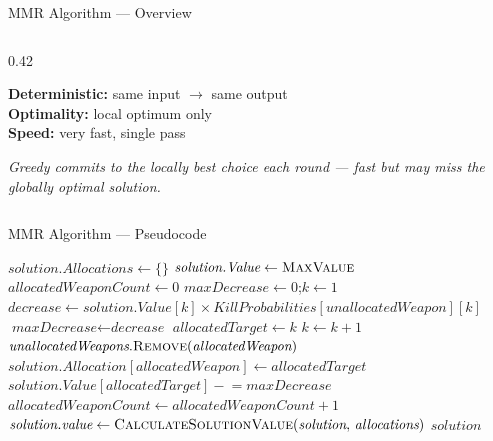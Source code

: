 \documentclass[aspectratio=169,10pt]{beamer}
\begin{document}
\begin{frame}{MMR Algorithm --- Overview}
\begin{columns}[T]
\begin{column}{0.42\textwidth}
{\begin{minipage}{\linewidth}
        {\small\color{navydark}\bfseries Deterministic:\;}
          {\small same input $\to$ same output}\\[5pt]
        {\small\color{navydark}\bfseries Optimality:\;}
          {\small local optimum only}\\[5pt]
        {\small\color{navydark}\bfseries Speed:\;}
          {\small very fast, single pass}
        \vspace{6pt}
      \end{minipage}}
      \vspace{16pt}
      \colorbox{navymidHex}{\begin{minipage}{\linewidth}
        \vspace{5pt}
        {\color{teallt}\small\itshape
         Greedy commits to the locally best choice each round ---
         fast but may miss the globally optimal solution.}
        \vspace{5pt}
      \end{minipage}}
    \end{column}
  \end{columns}
\end{frame}

\begin{frame}[shrink=20]{MMR Algorithm --- Pseudocode}
  \begin{center}
  {\footnotesize
  \begin{algorithm}[H]
    \caption{MMR Algorithm}
    \begin{algorithmic}[1]
      \State $\textit{solution.Allocations} \leftarrow \{\}$
      \State $\textit{solution.Value} \leftarrow \textsc{MaxValue}$
      \State $\textit{allocatedWeaponCount} \leftarrow 0$
        \State $\textit{maxDecrease} \leftarrow 0$;\quad $k \leftarrow 1$
          \State $\textit{decrease} \leftarrow \textit{solution.Value}[k] \times \textit{KillProbabilities}[\textit{unallocatedWeapon}][k]$
            \State $\textit{maxDecrease} \leftarrow \textit{decrease}$
            \State $\textit{allocatedTarget} \leftarrow k$
          \EndIf
          \State $k \leftarrow k + 1$
        \EndWhile
        \State $\textit{unallocatedWeapons}.\textsc{Remove}(\textit{allocatedWeapon})$
        \State $\textit{solution.Allocation}[\textit{allocatedWeapon}] \leftarrow \textit{allocatedTarget}$
        \State $\textit{solution.Value}[\textit{allocatedTarget}] \mathrel{-}= \textit{maxDecrease}$
        \State $\textit{allocatedWeaponCount} \leftarrow \textit{allocatedWeaponCount} + 1$
      \EndWhile
      \State $\textit{solution.value} \leftarrow \textsc{CalculateSolutionValue}(\textit{solution},\,\textit{allocations})$
      \State \Return $\textit{solution}$
    \end{algorithmic}
  \end{algorithm}
  }
  \end{center}
\end{frame}
\end{document}
